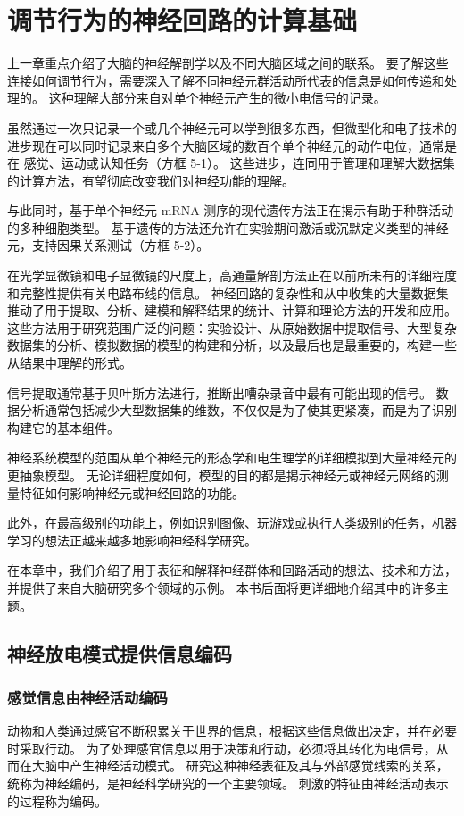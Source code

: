 \chapter{调节行为的神经回路的计算基础} \label{chap:chap5}
上一章重点介绍了大脑的神经解剖学以及不同大脑区域之间的联系。 要了解这些连接如何调节行为，需要深入了解不同神经元群活动所代表的信息是如何传递和处理的。 这种理解大部分来自对单个神经元产生的微小电信号的记录。

虽然通过一次只记录一个或几个神经元可以学到很多东西，但微型化和电子技术的进步现在可以同时记录来自多个大脑区域的数百个单个神经元的动作电位，通常是在 感觉、运动或认知任务（方框 5-1）。 这些进步，连同用于管理和理解大数据集的计算方法，有望彻底改变我们对神经功能的理解。

与此同时，基于单个神经元 mRNA 测序的现代遗传方法正在揭示有助于种群活动的多种细胞类型。 基于遗传的方法还允许在实验期间激活或沉默定义类型的神经元，支持因果关系测试（方框 5-2）。

在光学显微镜和电子显微镜的尺度上，高通量解剖方法正在以前所未有的详细程度和完整性提供有关电路布线的信息。 神经回路的复杂性和从中收集的大量数据集推动了用于提取、分析、建模和解释结果的统计、计算和理论方法的开发和应用。 这些方法用于研究范围广泛的问题：实验设计、从原始数据中提取信号、大型复杂数据集的分析、模拟数据的模型的构建和分析，以及最后也是最重要的，构建一些 从结果中理解的形式。

信号提取通常基于贝叶斯方法进行，推断出嘈杂录音中最有可能出现的信号。 数据分析通常包括减少大型数据集的维数，不仅仅是为了使其更紧凑，而是为了识别构建它的基本组件。

神经系统模型的范围从单个神经元的形态学和电生理学的详细模拟到大量神经元的更抽象模型。 无论详细程度如何，模型的目的都是揭示神经元或神经元网络的测量特征如何影响神经元或神经回路的功能。

此外，在最高级别的功能上，例如识别图像、玩游戏或执行人类级别的任务，机器学习的想法正越来越多地影响神经科学研究。

在本章中，我们介绍了用于表征和解释神经群体和回路活动的想法、技术和方法，并提供了来自大脑研究多个领域的示例。 本书后面将更详细地介绍其中的许多主题。

\section{神经放电模式提供信息编码}

\subsection{感觉信息由神经活动编码}
动物和人类通过感官不断积累关于世界的信息，根据这些信息做出决定，并在必要时采取行动。 为了处理感官信息以用于决策和行动，必须将其转化为电信号，从而在大脑中产生神经活动模式。 研究这种神经表征及其与外部感觉线索的关系，统称为神经编码，是神经科学研究的一个主要领域。 刺激的特征由神经活动表示的过程称为编码。

